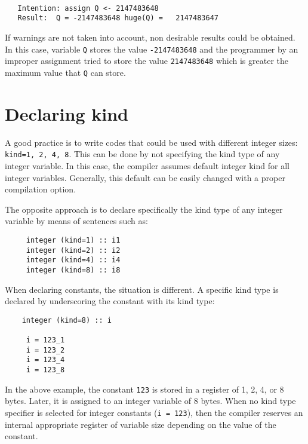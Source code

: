 \begin{verbatim}

   Intention: assign Q <- 2147483648
   Result:  Q = -2147483648 huge(Q) =   2147483647
\end{verbatim}
If warnings are not taken into account, non desirable results could be  obtained.  
In this case, variable \texttt{Q} stores the value  \texttt{-2147483648} and the 
programmer by an improper assignment tried to store the value \texttt{2147483648} which is greater 
the maximum value that \texttt{Q} can store.




    \section{Declaring kind}

A good practice is to write codes that could be used with different integer sizes: \texttt{kind=1, 2, 4, 8}. 
This can be done by not specifying the kind type of any integer variable. 
In this case, the compiler assumes default integer kind for all integer variables. 
Generally, this default can be easily changed  with a proper compilation option. 


The opposite approach is to declare specifically the kind type of any integer variable by means of 
sentences such as: 
 \begin{verbatim}
     integer (kind=1) :: i1
     integer (kind=2) :: i2
     integer (kind=4) :: i4
     integer (kind=8) :: i8
 \end{verbatim}
When declaring constants, the situation is different. A specific kind type is declared  by underscoring the 
constant with its kind type: 
 \begin{verbatim}
    integer (kind=8) :: i 
    
     i = 123_1 
     i = 123_2
     i = 123_4 
     i = 123_8
 \end{verbatim}
In the above example, the constant \texttt{123} is stored in a register of 1, 2, 4, or 8 bytes. Later, it is 
assigned to an integer variable of 8 bytes. 
When no kind type specifier is selected for integer constants (\texttt{i = 123}), 
then the compiler reserves an internal appropriate register of variable size
depending on the value of the constant. 

